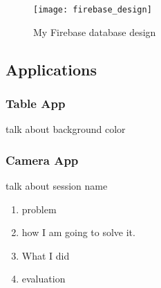 \begin{figure}
\centering
\texttt{[image: firebase\_design]}
\caption{My Firebase database design}
\label{firebase_design}
\end{figure}


\subsection{Applications}

\subsubsection{Table App} \label{tableapp}
talk about background color
\subsubsection{Camera App} \label{cameraapp}
talk about session name
\begin{enumerate}
\item problem 
\item how I am going to solve it.
\item What I did
\item evaluation
\end{enumerate}
    